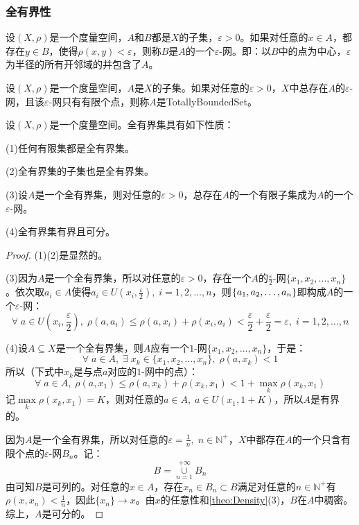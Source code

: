 \subsubsection{全有界性}
\begin{definition}
	设$(X,\rho)$是一个度量空间，$A$和$B$都是$X$的子集，$\varepsilon>0$。如果对任意的$x\in A$，都存在$y\in B$，使得$\rho(x,y)<\varepsilon$，则称$B$是$A$的一个$\varepsilon$-网。即：以$B$中的点为中心，$\varepsilon$为半径的所有开邻域的并包含了$A$。
\end{definition}
\begin{definition}
	设$(X,\rho)$是一个度量空间，$A$是$X$的子集。如果对任意的$\varepsilon>0$，$X$中总存在$A$的$\varepsilon$-网，且该$\varepsilon$-网只有有限个点，则称$A$是\gls{TotallyBoundedSet}。
\end{definition}
\begin{property}\label{prop:TotallyBoundedSet}
	设$(X,\rho)$是一个度量空间。全有界集具有如下性质：\par
	(1)任何有限集都是全有界集。\par
	(2)全有界集的子集也是全有界集。\par
	(3)设$A$是一个全有界集，则对任意的$\varepsilon>0$，总存在$A$的一个有限子集成为$A$的一个$\varepsilon$-网。\par
	(4)全有界集有界且可分。
\end{property}
\begin{proof}
	(1)(2)是显然的。\par
	(3)因为$A$是一个全有界集，所以对任意的$\varepsilon>0$，存在一个$A$的$\frac{\varepsilon}{2}$-网$\{x_1,x_2,\dots,x_n\}$。依次取$a_i\in A$使得$a_i\in U(x_i,\frac{\varepsilon}{2}),\;i=1,2,\dots,n$，则$\{a_1, a_2, \dots, a_{n}\}$即构成$A$的一个$\varepsilon$-网：
	\begin{equation*}
		\forall\;a\in U\left(x_i,\frac{\varepsilon}{2}\right),\;\rho(a,a_i)\leqslant\rho(a,x_i)+\rho(x_i,a_i)<\frac{\varepsilon}{2}+\frac{\varepsilon}{2}=\varepsilon,\;i=1,2,\dots,n
	\end{equation*}\par
	(4)设$A\subseteq X$是一个全有界集，则$A$应有一个$1$-网$\{x_1,x_2,\dots,x_n\}$，于是：
	\begin{equation*}
		\forall\;a\in A,\;\exists\;x_{k}\in\{x_1,x_2,\dots,x_n\},\;\rho(a,x_k)<1
	\end{equation*}
	所以（下式中$x_k$是与点$a$对应的$1$-网中的点）：
	\begin{equation*}
		\forall\;a\in A,\;\rho(a,x_1)\leqslant\rho(a,x_k)+\rho(x_k,x_1)<1+\max_{k}\rho(x_k,x_1)
	\end{equation*}
	记$\max\limits_{k}\rho(x_k,x_1)=K$，则对任意的$a\in A,\;a\in U(x_1,1+K)$，所以$A$是有界的。\par
	因为$A$是一个全有界集，所以对任意的$\varepsilon=\frac{1}{n},\;n\in\mathbb{N}^+$，$X$中都存在$A$的一个只含有限个点的$\varepsilon$-网$B_n$。记：
	\begin{equation*}
		B=\underset{n=1}{\overset{+\infty}{\cup}}B_n
	\end{equation*}
	由可知$B$是可列的。对任意的$x\in A$，存在$x_n\in B_n\subset B$满足对任意的$n\in\mathbb{N}^+$有$\rho(x,x_n)<\frac{1}{n}$，因此$\{x_n\}\to x$。由$x$的任意性和\cref{theo:Density}(3)，$B$在$A$中稠密。综上，$A$是可分的。
\end{proof}
